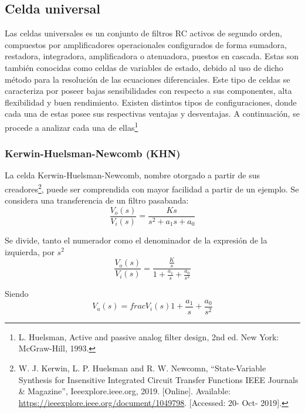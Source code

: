 



\subsection{Celda universal}
Las celdas universales es un conjunto de filtros RC activos de segundo orden, compuestos por amplificadores operacionales configurados de forma sumadora, restadora, integradora, amplificadora o atenuadora, puestos en cascada. Estas son también conocidas como celdas de variables de estado, debido al uso de dicho método para la resolución de las ecuaciones diferenciales. Este tipo de celdas se caracteriza por poseer bajas sensibilidades con respecto a sus componentes, alta flexibilidad y buen rendimiento. Existen distintos tipos de configuraciones, donde cada una de estas posee sus respectivas ventajas y desventajas. A continuación, se procede a analizar cada una de ellas\footnote{L. Huelsman, Active and passive analog filter design, 2nd ed. New York: McGraw-Hill, 1993.}

\subsubsection{Kerwin-Huelsman-Newcomb (KHN)}
La celda Kerwin-Huelsman-Newcomb, nombre otorgado a partir de sus creadores\footnote{W. J. Kerwin, L. P. Huelsman and R. W. Newcomn, ``State-Variable Synthesis for Insensitive Integrated Circuit Transfer Functions  IEEE Journals \& Magazine'', Ieeexplore.ieee.org, 2019. [Online]. Available: \url{https://ieeexplore.ieee.org/document/1049798}. [Accessed: 20- Oct- 2019].}, puede ser comprendida con mayor facilidad a partir de un ejemplo. Se considera una transferencia de un filtro pasabanda:
\begin{equation}
	\frac{V_o(s)}{V_i(s)} = \frac{Ks}{s^2 + a_1 s + a_0}
\end{equation}

Se divide, tanto el numerador como el denominador de la expresión de la izquierda, por $s^2$
\begin{equation}
	\frac{V_o(s)}{V_i(s)} = \frac{\frac{K}{s}}{1 + \frac{a_1}{s} + \frac{a_0}{s^2}}
	\label{equ:1}
\end{equation}

Siendo
\begin{equation}
	V_a(s) = frac{V_i(s)}{1 + \frac{a_1}{s} + \frac{a_0}{s^2}}
	\label{equ:2}
\end{equation}

